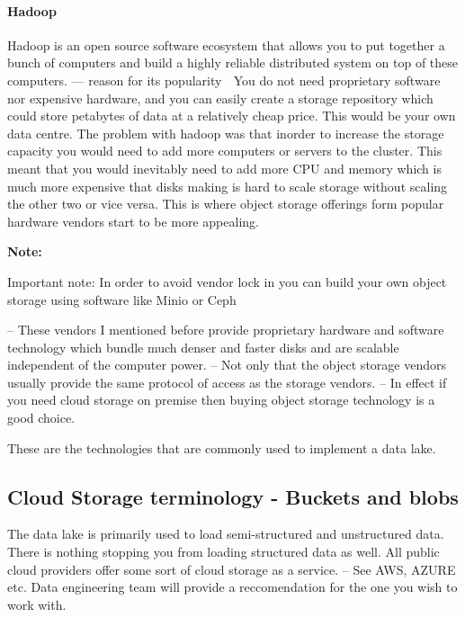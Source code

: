 \documentclass[a4paper, 11pt]{article}
\newenvironment{note}{
    \begin{siderule}
        \textbf{Note: }
        }{
    \end{siderule}}
\begin{document}
    \paragraph{Hadoop}
    Hadoop is an open source software ecosystem that allows you to put together a bunch of computers and build a highly reliable distributed system on top of these computers.
    --- reason for its popularity ^^^
    You do not need proprietary software nor expensive hardware, and you can easily create a storage repository which could store petabytes of data at a relatively cheap price.
    This would be your own data centre.
    The problem with hadoop was that inorder to increase the storage capacity you would need to add more computers or servers to the cluster.
    This meant that you would inevitably need to add more CPU and memory which is much more expensive that disks making is hard to scale storage without scaling the other two or vice versa.
    This is where object storage offerings form popular hardware vendors start to be more appealing.
    \begin{note}
        Important note: In order to avoid vendor lock in you can build your own object storage using software like Minio or Ceph
    \end{note}

    -- These vendors I mentioned before provide proprietary hardware and software technology which bundle much denser and faster disks and are scalable independent of the computer power.
    -- Not only that the object storage vendors usually provide the same protocol of access as the storage vendors.
    -- In effect if you need cloud storage on premise then buying object storage technology is a good choice.

    These are the technologies that are commonly used to implement a data lake.

    \subsection{Cloud Storage terminology - Buckets and blobs}

    The data lake is primarily used to load semi-structured and unstructured data.
    There is nothing stopping you from loading structured data as well.
    All public cloud providers offer some sort of cloud storage as a service.
    -- See AWS, AZURE etc. Data engineering team will provide a reccomendation for the one you wish to work with.
\end{document}
